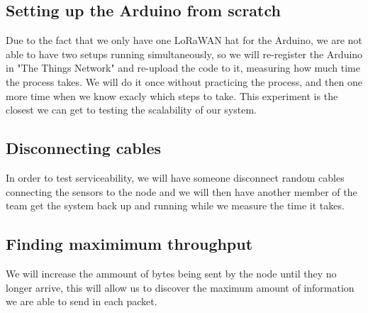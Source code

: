 	\subsection{Setting up the Arduino from scratch}
		Due to the fact that we only have one LoRaWAN hat for the Arduino, we are not able to have two setups running simultaneously, so we will re-register the Arduino in "The Things Network" and re-upload the code to it, measuring how much time the process takes. We will do it once without practicing the process, and then one more time when we know exacly which steps to take. This experiment is the closest we can get to testing the scalability of our system.

	\subsection{Disconnecting cables}
		In order to test serviceability, we will have someone disconnect random cables connecting the sensors to the node and we will then have another member of the team get the system back up and running while we measure the time it takes.

	\subsection{Finding maximimum throughput}
		We will increase the ammount of bytes being sent by the node until they no longer arrive, this will allow us to discover the maximum amount of information we are able to send in each packet.

